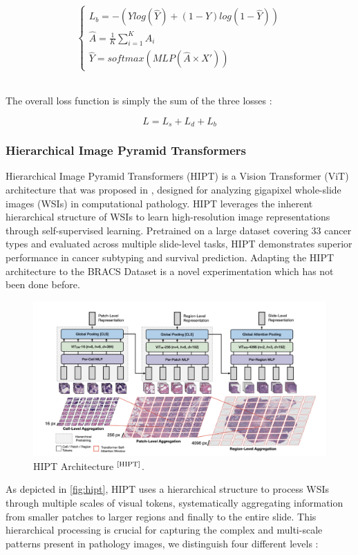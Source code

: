 \documentclass[
11pt, %
english, %
singlespacing, %
headsepline, %
]{project_structure}
\begin{document}
$$
\begin{cases}
L_{b} = - (Y log(\hat{Y}) + (1 - Y) log(1 - \hat{Y})) \\
\hat{A} = \frac{1}{K} \sum\limits_{i=1}^{K} A_{i}\\
\hat{Y} = softmax(MLP(\hat{A} \times X'))
\end{cases}
$$


\noindent \\The overall loss function is simply the sum of the three losses :

$$
L = L_{s} + L_{d} + L_{b}
$$

\subsubsection{Hierarchical Image Pyramid Transformers}

\noindent Hierarchical Image Pyramid Transformers (\acrshort{HIPT}) is a Vision Transformer (\acrshort{ViT}) architecture that was proposed in \cite{HIPT}, designed for analyzing gigapixel whole-slide images (\acrshort{WSI}s) in computational pathology. \acrshort{HIPT} leverages the inherent hierarchical structure of \acrshort{WSI}s to learn high-resolution image representations through self-supervised learning. Pretrained on a large dataset covering 33 cancer types and evaluated across multiple slide-level tasks, \acrshort{HIPT} demonstrates superior performance in cancer subtyping and survival prediction. Adapting the \acrshort{HIPT} architecture to the \acrshort{BRACS} Dataset is a novel experimentation which has not been done before. \\
\begin{figure}[H]
    \centering
    \includegraphics[width=1\linewidth]{figures/hipt.png}
    \caption{HIPT Architecture $^{\text{\cite{HIPT}}}$.}
    \label{fig:hipt}
\end{figure}
\noindent As depicted in \autoref{fig:hipt}, \acrshort{HIPT} uses a hierarchical structure to process \acrshort{WSI}s through multiple scales of visual tokens, systematically aggregating information from smaller patches to larger regions and finally to the entire slide. This hierarchical processing is crucial for capturing the complex and multi-scale patterns present in pathology images, we distinguish four different levels : \\
\end{document}
